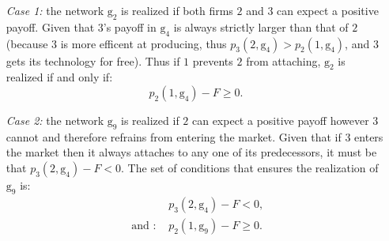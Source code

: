 \documentclass{article}
\begin{document}
\begin{enumerate}
    \item[\textit{Case 1:}] the network $\text{g}_2$ is realized if both firms $2$ and $3$ can expect a positive payoff. Given that $3$'s payoff in $\text{g}_4$ is always strictly larger than that of $2$ (because $3$ is more efficent at producing, thus $p_3(2,\text{g}_4)>p_2(1,\text{g}_4)$, and $3$ gets its technology for free). Thus if $1$ prevents $2$ from attaching, $\text{g}_2$ is realized if and only if: 
    \begin{equation*}
         p_2(1,\text{g}_4)-F \geq 0.
    \end{equation*}
   \item[\textit{Case 2:}] the network $\text{g}_9$ is realized if $2$ can expect a positive payoff however $3$ cannot and therefore refrains from entering the market. Given that if $3$ enters the market then it always attaches to any one of its predecessors, it must be that $p_3(2,\text{g}_4)-F<0$. The set of conditions that ensures the realization of $\text{g}_9$ is: 
   \begin{align*}
       & p_3(2,\text{g}_4)-F<0, \\
       \mbox{ and : } & p_2(1,\text{g}_9)-F\geq 0.
   \end{align*}
   

\end{enumerate}
\end{document}
